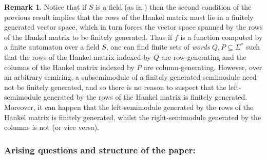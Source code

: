 \documentclass[10pt,a4paper]{amsart}
\theoremstyle{definition}
\newtheorem{rem}[thm]{Remark}
\numberwithin{equation}{section}
\numberwithin{theorem}{section}
\begin{document}
\begin{rem}
\label{rem:fields1}
Notice that if $S$ is a field (as in \cite{F74}) then the second condition of the previous result implies that the rows of the Hankel matrix must lie in a finitely generated vector space, which in turn forces the vector space spanned by the rows of the Hankel matrix to be finitely generated. Thus if $f$ is a function computed by a finite automaton over a field $S$,  one can find finite sets of \emph{words} $Q,P \subseteq \Sigma^*$ such that the rows of the Hankel matrix indexed by $Q$ are row-generating and the columns of the Hankel matrix indexed by $P$ are column-generating. However, over an arbitrary semiring, a subsemimodule of a finitely generated semimodule need not be finitely generated, and so there is no reason to suspect that the left-semimodule generated by the rows of the Hankel matrix is finitely generated. Moreover, it can happen that the left-semimodule generated by the rows of the Hankel matrix is finitely generated, whilst the right-semimodule generated by the columns is not (or vice versa).
\end{rem}



\subsubsection*{\textbf{Arising questions and structure of the paper:}}
\end{document}
